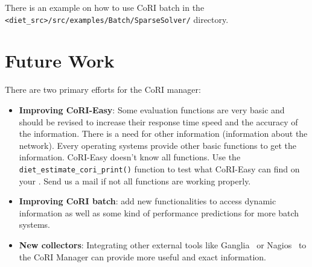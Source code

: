 There is an example on how to use CoRI batch in the\\
\verb!<diet_src>/src/examples/Batch/SparseSolver/! directory.

\section{Future Work}

There are two primary efforts for the CoRI manager:
\begin{itemize}
\item \textbf{Improving CoRI-Easy}: Some evaluation functions are very basic
  and should be revised to increase their response time speed and the accuracy
  of the information. There is a need for other information (\ie information
  about the network). Every operating systems provide other basic functions to
  get the information. CoRI-Easy doesn't know all functions. Use the
  \texttt{diet\_estimate\_cori\_print()} function to test what CoRI-Easy can
  find on your \sed. Send us a mail if not  all functions are working properly.

\item \textbf{Improving CoRI batch}: add new functionalities to access dynamic
  information as well as some kind of performance predictions for more batch
  systems.

\item \textbf{New collectors}: Integrating other external tools like
  Ganglia~\cite{Ganglia} or Nagios~\cite{Nagios} to the CoRI Manager can
  provide more useful and exact information.
\end{itemize}

